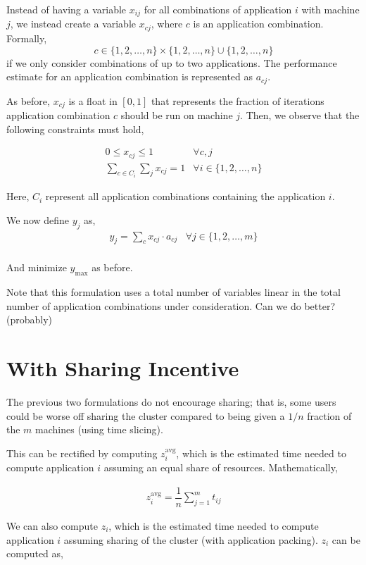 \documentclass{article}
\begin{document}
Instead of having a variable $x_{ij}$ for all combinations of application $i$
with machine $j$, we instead create a variable $x_{cj}$,
where $c$ is an application combination. Formally,
$$c \in \{1, 2, \ldots, n\} \times \{1, 2, \ldots, n\} \cup \{1, 2, \ldots, n\}$$
if we only consider combinations of up to two applications.
The performance estimate for an application combination is represented
as $a_{cj}$.

As before, $x_{cj}$ is a float in $[0, 1]$ that represents the
fraction of iterations application combination $c$ should be run on
machine $j$. Then, we observe that the following constraints must hold,

\begin{eqnarray}
0 \leq x_{cj} \leq 1 & \forall c,j \nonumber \\
\sum_{c \in C_i} \sum_j x_{cj} = 1 & \forall i \in \{1, 2, \ldots, n\} \nonumber
\end{eqnarray}

Here, $C_i$ represent all application combinations containing the application $i$.

We now define $y_j$ as,
\begin{eqnarray}
y_j = \sum_c x_{cj} \cdot a_{cj} & \forall j \in \{1, 2, \ldots, m\} \nonumber \\
\end{eqnarray}

And minimize $y_{\text{max}}$ as before.

Note that this formulation uses a total number of variables
linear in the total number of application combinations
under consideration. Can we do better? (probably)

\section{With Sharing Incentive}
The previous two formulations do not encourage sharing; that is, some users
could be worse off sharing the cluster compared to being given a $1/n$ fraction
of the $m$ machines (using time slicing).

This can be rectified by computing $z_i^{\text{avg}}$, which is the estimated
time needed to compute application $i$ assuming an equal share of resources.
Mathematically,

\begin{eqnarray}
z_i^{\text{avg}} = \dfrac{1}{n} \sum_{j=1}^m t_{ij} \nonumber
\end{eqnarray}

We can also compute $z_i$, which is the estimated time needed to compute application
$i$ assuming sharing of the cluster (with application packing). $z_i$ can be
computed as,
\end{document}

